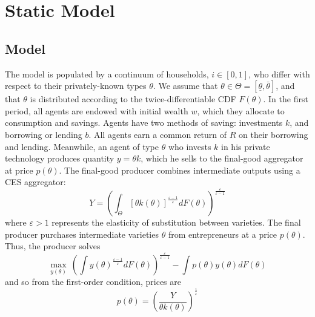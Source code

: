 \documentclass[11pt]{article}
\begin{document}
\section{Static Model} \label{sec:static_mod}
\subsection{Model}

The model is populated by a continuum of households, \( i\in[0,1] \), who differ with respect to their privately-known types \( \theta \). We assume that \( \theta\in\Theta=\left[ \underline{\theta}, \bar{\theta} \right] \), and that \( \theta \) is distributed according to the twice-differentiable CDF \( F(\theta) \). In the first period, all agents are endowed with initial wealth \( w \), which they allocate to consumption and savings. Agents have two methods of saving: investments \( k \), and borrowing or lending \( b \). All agents earn a common return of \( R \) on their borrowing and lending. Meanwhile, an agent of type \( \theta \) who invests \( k \) in his private technology produces quantity \( y = \theta k \), which he sells to the final-good aggregator at price \( p(\theta) \). The final-good producer combines intermediate outputs using a CES aggregator:
\begin{equation}
    Y = \left(\int_{\Theta}\left[\theta k\left(\theta\right)\right]^{\frac{\varepsilon-1}{\varepsilon}}dF\left(\theta\right)\right)^{\frac{\varepsilon}{\varepsilon-1}}
\end{equation}
where \( \varepsilon>1 \) represents the elasticity of substitution between varieties. The final producer purchases intermediate varieties \( \theta \) from entrepreneurs at a price \( p(\theta) \). Thus, the producer solves 
\begin{equation}
    \max_{y\left(\theta\right)}\ \left(\int y\left(\theta\right)^{\frac{\varepsilon-1}{\varepsilon}}dF\left(\theta\right)\right)^{\frac{\varepsilon}{\varepsilon-1}}-\int p\left(\theta\right)y\left(\theta\right)dF\left(\theta\right) 
\end{equation}
and so from the first-order condition, prices are 
\begin{equation}
    p(\theta) = \left(\frac{Y}{\theta k\left(\theta\right)}\right)^{\frac{1}{\varepsilon}} \label{eq:static_ptheta}
\end{equation}
\end{document}
